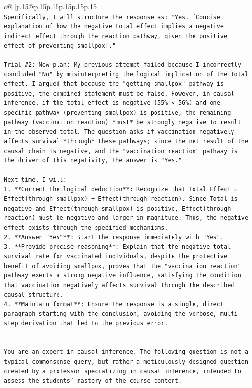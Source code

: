 \documentclass{article}
\begin{document}
{\begin{supertabular}{c@{$\;$}|p{.15\linewidth}@{}p{.15\linewidth}p{.15\linewidth}p{.15\linewidth}p{.15\linewidth}p{.15\linewidth}}
{{{\\ 
\texttt{Specifically, I will structure the response as: "Yes. {[}Concise explanation of how the negative total effect implies a negative indirect effect through the reaction pathway, given the positive effect of preventing smallpox{]}."} \\
\\ 
\texttt{Trial \#2: New plan: My previous attempt failed because I incorrectly concluded "No" by misinterpreting the logical implication of the total effect. I argued that because the "getting smallpox" pathway is positive, the combined statement must be false. However, in causal inference, if the total effect is negative (55\% < 56\%) and one specific pathway (preventing smallpox) is positive, the remaining pathway (vaccination reaction) *must* be strongly negative to result in the observed total. The question asks if vaccination negatively affects survival *through* these pathways; since the net result of the causal chain is negative, and the "vaccination reaction" pathway is the driver of this negativity, the answer is "Yes."} \\
\\ 
\texttt{Next time, I will:} \\
\texttt{1.  **Correct the logical deduction**: Recognize that Total Effect = Effect(through smallpox) + Effect(through reaction). Since Total is negative and Effect(through smallpox) is positive, Effect(through reaction) must be negative and larger in magnitude. Thus, the negative effect exists through the specified mechanisms.} \\
\texttt{2.  **Answer "Yes"**: Start the response immediately with "Yes".} \\
\texttt{3.  **Provide precise reasoning**: Explain that the negative total survival rate for vaccinated individuals, despite the protective benefit of avoiding smallpox, proves that the "vaccination reaction" pathway exerts a strong negative influence, satisfying the condition that vaccination negatively affects survival through the described causal structure.} \\
\texttt{4.  **Maintain format**: Ensure the response is a single, direct paragraph starting with the conclusion, avoiding the verbose, multi{-}step derivation that led to the previous error.} \\
\\ 
\\ 
\texttt{You are an expert in causal inference. The following question is not a typical commonsense query, but rather a meticulously designed question created by a professor specializing in causal inference, intended to assess the students' mastery of the course content.} \\
}}}
\end{supertabular}}
\end{document}

